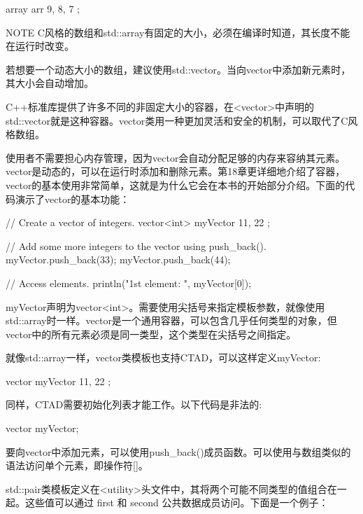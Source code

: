 \begin{cpp}
array arr { 9, 8, 7 };
\end{cpp}

\begin{myNotic}{NOTE}
C风格的数组和std::array有固定的大小，必须在编译时知道，其长度不能在运行时改变。
\end{myNotic}

若想要一个动态大小的数组，建议使用std::vector。当向vector中添加新元素时，其大小会自动增加。


C++标准库提供了许多不同的非固定大小的容器，在<vector>中声明的std::vector就是这种容器。vector类用一种更加灵活和安全的机制，可以取代了C风格数组。

使用者不需要担心内存管理，因为vector会自动分配足够的内存来容纳其元素。vector是动态的，可以在运行时添加和删除元素。第18章更详细地介绍了容器，vector的基本使用非常简单，这就是为什么它会在本书的开始部分介绍。下面的代码演示了vector的基本功能：


\begin{cpp}
// Create a vector of integers.
vector<int> myVector { 11, 22 };

// Add some more integers to the vector using push_back().
myVector.push_back(33);
myVector.push_back(44);

// Access elements.
println("1st element: {}", myVector[0]);
\end{cpp}

myVector声明为vector<int>。需要使用尖括号来指定模板参数，就像使用std::array时一样。vector是一个通用容器，可以包含几乎任何类型的对象，但vector中的所有元素必须是同一类型，这个类型在尖括号之间指定。

就像std::array一样，vector类模板也支持CTAD，可以这样定义myVector:

\begin{cpp}
vector myVector { 11, 22 };
\end{cpp}

同样，CTAD需要初始化列表才能工作。以下代码是非法的:

\begin{cpp}
vector myVector;
\end{cpp}

要向vector中添加元素，可以使用push\_back()成员函数。可以使用与数组类似的语法访问单个元素，即操作符[]。


std::pair类模板定义在<utility>头文件中，其将两个可能不同类型的值组合在一起。这些值可以通过 first 和 second 公共数据成员访问。下面是一个例子：

